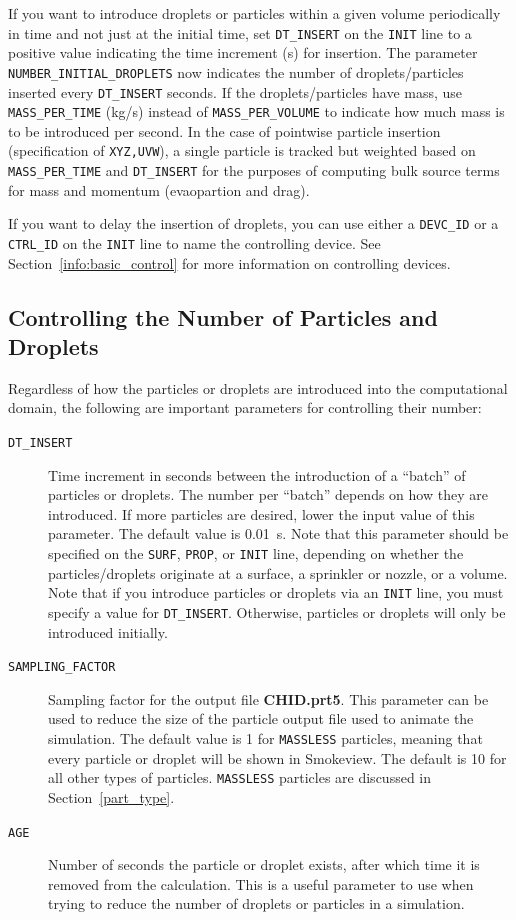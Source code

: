 \documentclass[11pt]{book}
\newcommand{\ct}{\tt\small}
\begin{document}
\noindent
If you want to introduce droplets or particles within a given volume periodically in time and not just at the initial time, set {\ct DT\_INSERT} on the {\ct INIT} line to a positive value indicating the time increment (s) for insertion. The parameter {\ct NUMBER\_INITIAL\_DROPLETS} now indicates the number of droplets/particles inserted every {\ct DT\_INSERT} seconds. If the droplets/particles have mass, use {\ct MASS\_PER\_TIME} (kg/s) instead of {\ct MASS\_PER\_VOLUME} to indicate how much mass is to be introduced per second.  In the case of pointwise particle insertion (specification of {\ct XYZ,UVW}), a single particle is tracked but weighted based on {\ct MASS\_PER\_TIME} and {\ct DT\_INSERT} for the purposes of computing bulk source terms for mass and momentum (evaopartion and drag).

If you want to delay the insertion of droplets, you can use either a {\ct DEVC\_ID} or a {\ct CTRL\_ID} on the {\ct INIT} line to name the controlling device.
See Section~\ref{info:basic_control} for more information on controlling devices.


\subsection{Controlling the Number of Particles and Droplets}
\label{info:particle_number}

Regardless of how the particles or droplets are introduced into the computational domain, the following are important
parameters for controlling their number:
\begin{description}
\item[{\ct DT\_INSERT}] Time increment in seconds between the introduction of a ``batch'' of particles or droplets.
The number per ``batch'' depends on how they are introduced.
If more particles are desired, lower the input value of this parameter. The default value is 0.01~s. Note that this
parameter should be specified on the {\ct SURF}, {\ct PROP}, or {\ct INIT} line, depending on whether the particles/droplets
originate at a surface, a sprinkler or nozzle, or a volume. Note that if you introduce particles or droplets via an {\ct INIT} line,
you must specify a value for {\ct DT\_INSERT}. Otherwise, particles or
droplets will only be introduced initially.
\item[{\ct SAMPLING\_FACTOR}]     Sampling factor for the output
file {\bf CHID.prt5}. This parameter can be used to reduce the size
of the particle output file used to animate the simulation. The default value is 1 for {\ct MASSLESS} particles, meaning that every particle or droplet will be shown in Smokeview. The default
is 10 for all other types of particles. {\ct MASSLESS} particles are discussed in Section~\ref{part_type}.
\item[{\ct AGE}]  Number of seconds the particle or droplet exists, after which time it is removed from the calculation. This is a useful parameter to use when
trying to reduce the number of droplets or particles in a simulation.
\end{description}
\end{document}
